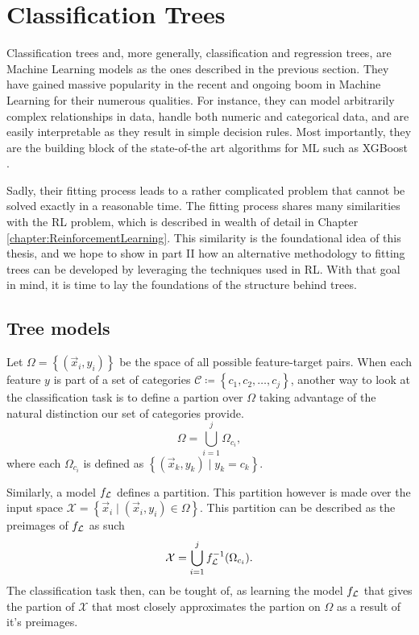 \section{Classification Trees}
Classification trees and, more generally, classification and regression trees,
are Machine Learning models as the ones described in the previous section. They
have gained massive popularity in the recent and ongoing boom in Machine
Learning for their numerous qualities. For instance, they can model arbitrarily
complex relationships in data, handle both numeric and categorical data, and are
easily interpretable as they result in simple decision rules. Most importantly,
they are the building block of the state-of-the art algorithms for ML such as
XGBoost \cite{XGBoost}.

Sadly, their fitting process leads to a rather complicated problem that cannot
be solved exactly in a reasonable time. The fitting process shares many
similarities with the RL problem, which is described in wealth of detail in
Chapter \ref{chapter:ReinforcementLearning}. This similarity is the foundational
idea of this thesis, and we hope to show in part II how an alternative
methodology to fitting trees can be developed by leveraging the techniques used
in RL. With that goal in mind, it is time to lay the foundations of the
structure behind trees.

\subsection{Tree models}
Let $\Omega = \left\{ (\vec{x}_i, y_i) \right\}$ be the space of all possible
feature-target pairs. When each feature $y$ is part of a set of categories
$\mathcal{C} \coloneqq \left\{ c_1, c_2, \dots, c_j \right\}$, another way to
look at the classification task is to define a partion over $\Omega$ taking
advantage of the natural distinction our set of categories provide.
\begin{equation*}
    \Omega = \bigcup_{i=1}^{j} \Omega_{c_i},
\end{equation*}
where each $\Omega_{c_i}$ is defined as $\left\{ (\vec{x}_k, y_k) \mid y_k = c_k
\right\}$.

Similarly, a model $f_{\mathcal{L}}$ defines a partition. This partition however is made
over the input space $\mathcal{X} = \left\{ \vec{x}_i \mid (\vec{x}_i, y_i) \in
\Omega \right\}$. This partition can be described as the preimages of $f_{\mathcal{L}}$ as
such
\begin{equation*}
    \mathcal{X} = \bigcup_{i=1}^{j} f_{\mathcal{L}}^{-1}(\Omega_{c_i}).
\end{equation*}
The classification task then, can be tought of, as learning the model $f_{\mathcal{L}}$
that gives the partion of $\mathcal{X}$ that most closely approximates the
partion on $\Omega$ as a result of it's preimages.

